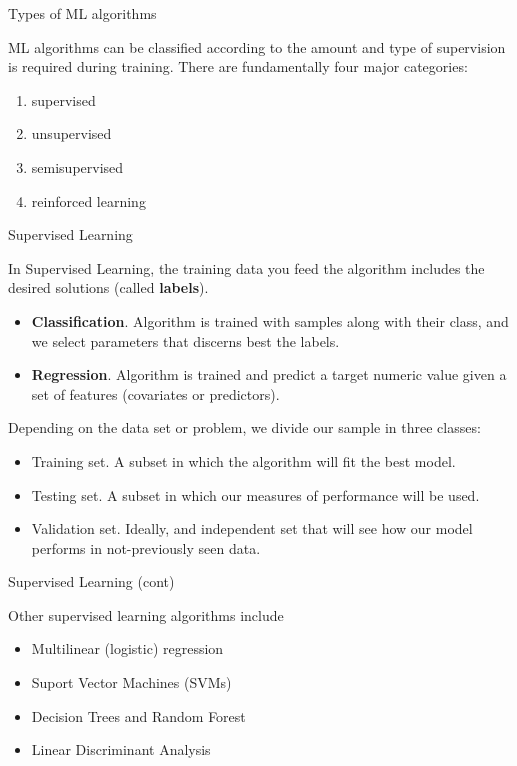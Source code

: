 \documentclass[11pt, aspectratio=43]{beamer}
\begin{document}
\begin{frame}{Types of ML algorithms}
		
	ML algorithms can be classified according to the amount and type of supervision is required during training. There are fundamentally four major categories: 
	\begin{enumerate}
		\item supervised
		\item unsupervised
		\item semisupervised
		\item reinforced learning
	\end{enumerate}
	
\end{frame}

\begin{frame}{Supervised Learning}
	
	In Supervised Learning, the training data you feed the algorithm includes the desired solutions (called \textbf{labels}).
	
\begin{itemize}
	\item \textbf{Classification}. Algorithm is trained with samples along with their class, and we select parameters that discerns best the labels.
	\item \textbf{Regression}. Algorithm is trained and predict a target numeric value given a set of features (covariates or predictors).
\end{itemize}

Depending on the data set or problem, we divide our sample in three classes:
\begin{itemize}
	\item Training set. A subset in which the algorithm will fit the best model.
	\item Testing set. A subset in which our measures of performance will be used.
	\item Validation set. Ideally, and independent set that will see how our model performs in not-previously seen data.
\end{itemize}
	

\end{frame}


\begin{frame}{Supervised Learning (cont)}
	
	
	Other supervised learning algorithms include
	\begin{itemize}
		\item 	Multilinear (logistic) regression
		\item 	Suport Vector Machines (SVMs)
		\item 	Decision Trees and Random Forest
		\item  Linear Discriminant Analysis
	\end{itemize}


\end{frame}
\end{document}
